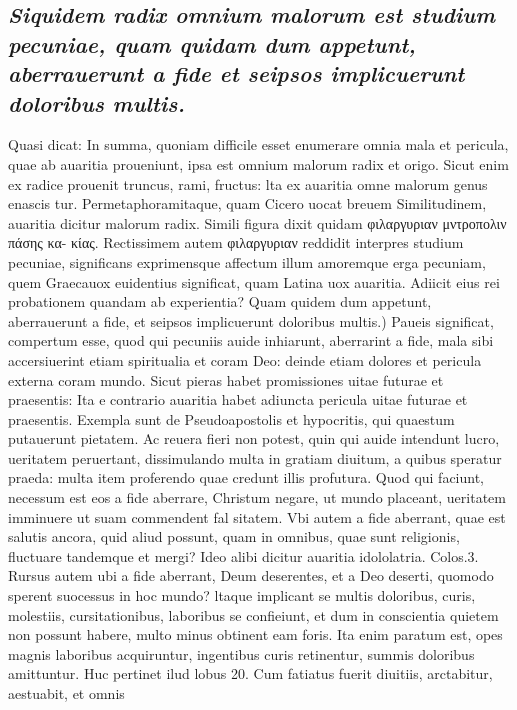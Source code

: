 \documentclass{article}
\begin{document}
\begin{pages}
\subsection*{\textit{Siquidem radix omnium malorum est studium pecuniae, quam quidam dum appetunt, aberrauerunt a fide et seipsos implicuerunt doloribus multis. }}\pstart Quasi dicat: In summa, quoniam difficile esset enumerare omnia mala et pericula, quae ab auaritia proueniunt, ipsa est omnium malorum radix et origo. Sicut enim ex radice prouenit truncus, rami, fructus: lta ex auaritia omne malorum genus enascis tur. Permetaphoramitaque, quam Cicero uocat breuem Similitudinem, auaritia dicitur malorum radix. Simili figura dixit quidam φιλαργυριαν μντροπολιν πάσης κα- κίας. Rectissimem autem φιλαργυριαν reddidit interpres studium pecuniae, significans exprimensque affectum illum amoremque erga pecuniam, quem Graecauox euidentius significat, quam Latina uox auaritia. Adiicit eius rei probationem quandam ab experientia?  \pend\pstart Quam quidem dum appetunt, aberrauerunt a fide, et seipsos implicuerunt doloribus multis.) Paueis significat, compertum esse, quod qui pecuniis auide inhiarunt, aberrarint a fide, mala sibi accersiuerint etiam spiritualia et coram Deo: deinde etiam dolores et pericula externa coram mundo. Sicut pieras habet promissiones uitae futurae et praesentis: Ita e contrario auaritia habet adiuncta pericula uitae futurae et praesentis. Exempla sunt de Pseudoapostolis et hypocritis, qui quaestum putauerunt pietatem. Ac reuera fieri non potest, quin qui auide intendunt lucro, ueritatem peruertant, dissimulando multa in gratiam diuitum, a quibus speratur praeda: multa item proferendo quae credunt illis profutura. Quod qui faciunt, necessum est eos a fide aberrare, Christum negare, ut mundo placeant, ueritatem imminuere ut suam commendent fal sitatem. Vbi autem a fide aberrant, quae est salutis ancora, quid aliud possunt, quam in omnibus, quae sunt religionis, fluctuare tandemque et mergi? Ideo alibi dicitur auaritia idololatria. Colos.3. Rursus autem ubi a fide aberrant, Deum deserentes, et a Deo deserti, quomodo sperent suocessus in hoc mundo? ltaque implicant se multis doloribus, curis, molestiis, cursitationibus, laboribus se confieiunt, et dum in conscientia quietem non possunt habere, multo minus obtinent eam foris. Ita enim paratum est, opes magnis laboribus acquiruntur, ingentibus curis retinentur, summis doloribus amittuntur. Huc pertinet ilud lobus 20. Cum fatiatus fuerit diuitiis, arctabitur, aestuabit, et omnis  \pend
\vspace{0.5cm}\noindent

\end{pages}
\end{document}
